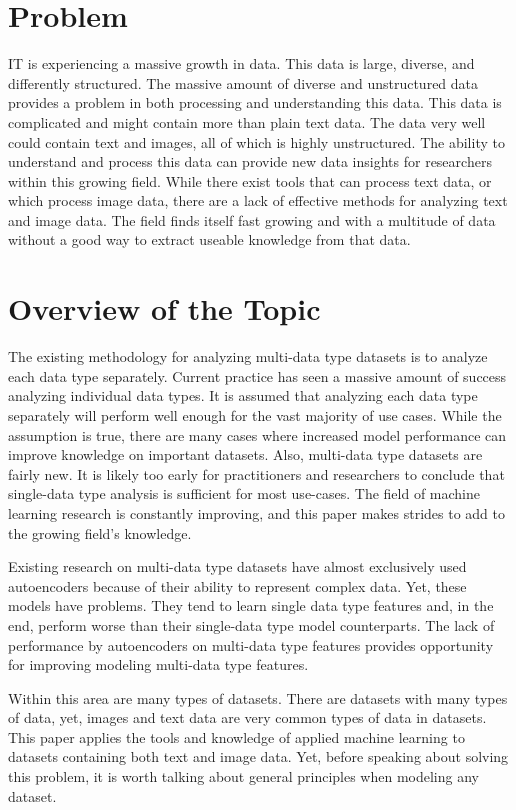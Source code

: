 
\chapter{Problem}
IT is experiencing a massive growth in data.  This data is large, diverse, and differently structured.  The massive amount of diverse and unstructured data provides a problem in both processing and understanding this data.  This data is complicated and might contain more than plain text data.  The data very well could contain text and images, all of which is highly unstructured. The ability to understand and process this data can provide new data insights for researchers within this growing field. While there exist tools that can process text data, or which process image data, there are a lack of effective methods for analyzing text and image data.  The field finds itself fast growing and with a multitude of data without a good way to extract useable knowledge from that data. 

\chapter{Overview of the Topic}
The existing methodology for analyzing multi-data type datasets is to analyze each data type separately.  Current practice has seen a massive amount of success analyzing individual data types.  It is assumed that analyzing each data type separately will perform well enough for the vast majority of use cases.  While the assumption is true, there are many cases where increased model performance can improve knowledge on important datasets.  Also, multi-data type datasets are fairly new.  It is likely too early for practitioners and researchers to conclude that single-data type analysis is sufficient for most use-cases.  The field of machine learning research is constantly improving, and this paper makes strides to add to the growing field's knowledge.

Existing research on multi-data type datasets have almost exclusively used autoencoders because of their ability to represent complex data.  Yet, these models have problems.  They tend to learn single data type features and, in the end, perform worse than their single-data type model counterparts.  The lack of performance by autoencoders on multi-data type features provides opportunity for improving modeling multi-data type features.

Within this area are many types of datasets.  There are datasets with many types of data, yet, images and text data are very common types of data in datasets.  This paper applies the tools and knowledge of applied machine learning to datasets containing both text and image data.  Yet, before speaking about solving this problem, it is worth talking about general principles when modeling any dataset.  

